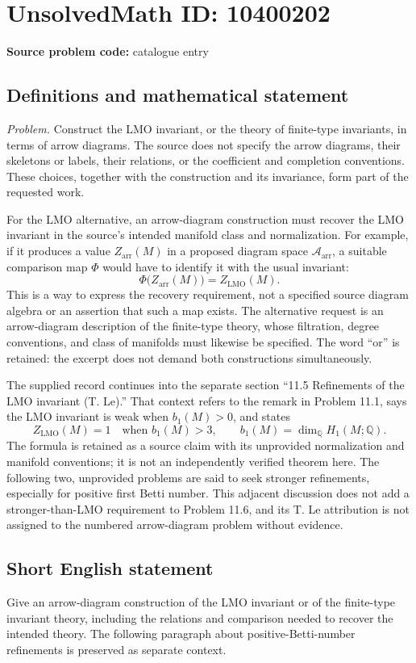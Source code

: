 \documentclass[11pt]{article}
\newcommand{\Q}{\mathbb{Q}}
\begin{document}
\section*{UnsolvedMath ID: 10400202}
\textbf{Source problem code:} catalogue entry
\subsection{Definitions and mathematical statement}
\emph{Problem.} Construct the LMO invariant, or the theory of finite-type invariants, in terms of arrow diagrams. The source does not specify the arrow diagrams, their skeletons or labels, their relations, or the coefficient and completion conventions. These choices, together with the construction and its invariance, form part of the requested work.

For the LMO alternative, an arrow-diagram construction must recover the LMO invariant in the source's intended manifold class and normalization. For example, if it produces a value \(Z_{\mathrm{arr}}(M)\) in a proposed diagram space \(\mathcal A_{\mathrm{arr}}\), a suitable comparison map \(\Phi\) would have to identify it with the usual invariant:
\[
 \Phi\bigl(Z_{\mathrm{arr}}(M)\bigr)=Z_{\mathrm{LMO}}(M).
\]
This is a way to express the recovery requirement, not a specified source diagram algebra or an assertion that such a map exists. The alternative request is an arrow-diagram description of the finite-type theory, whose filtration, degree conventions, and class of manifolds must likewise be specified. The word ``or'' is retained: the excerpt does not demand both constructions simultaneously.

The supplied record continues into the separate section ``11.5 Refinements of the LMO invariant (T. Le).'' That context refers to the remark in Problem 11.1, says the LMO invariant is weak when \(b_1(M)>0\), and states
\[
 Z_{\mathrm{LMO}}(M)=1\quad\text{when }b_1(M)>3,
 \qquad b_1(M)=\dim_\Q H_1(M;\Q).
\]
The formula is retained as a source claim with its unprovided normalization and manifold conventions; it is not an independently verified theorem here. The following two, unprovided problems are said to seek stronger refinements, especially for positive first Betti number. This adjacent discussion does not add a stronger-than-LMO requirement to Problem 11.6, and its T. Le attribution is not assigned to the numbered arrow-diagram problem without evidence.
\subsection{Short English statement}
Give an arrow-diagram construction of the LMO invariant or of the finite-type invariant theory, including the relations and comparison needed to recover the intended theory. The following paragraph about positive-Betti-number refinements is preserved as separate context.
\end{document}
